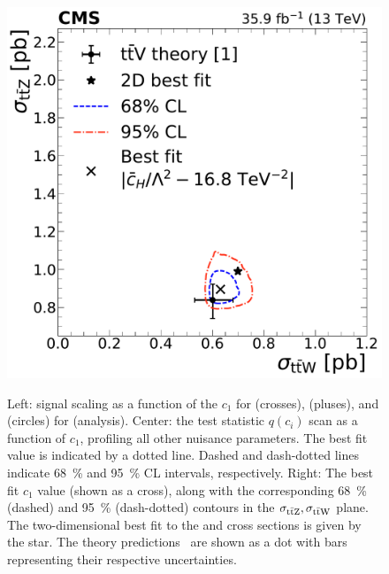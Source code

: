\begin{landscape}
\begin{figure}
{        \includegraphics[height=\textheight]{figures/thirteen-TeV/NP/2D/ttZ_ttW_2D_1D_cH}
      }
    \setlength{\capwidth}{14cm}
    \caption[Profile likelihood, $\mu(c_1)$, and best fit $c_1$ for \cH (\thirteenTeV)]{Left: signal scaling as a function of the $c_1$ for \ttW (crosses), \ttZ (pluses), and \ttH (circles) for \cH (\thirteenTeV analysis). Center: the test statistic $q(c_i)$ scan as a function of $c_1$, profiling all other nuisance parameters. The best fit value is indicated by a dotted line. Dashed and dash-dotted lines indicate \SI{68}{\percent} and \SI{95}{\percent} CL intervals, respectively. Right: The best fit $c_1$ value (shown as a cross), along with the corresponding \SI{68}{\percent} (dashed) and \SI{95}{\percent} (dash-dotted) contours in the $\sigma_{\text{t}\bar{\text{t}}\text{Z}}, \sigma_{\text{t}\bar{\text{t}}\text{W}}$ plane. The two-dimensional best fit to the \ttW and \ttZ cross sections is given by the star. The theory predictions~\cite{deFlorian:2016spz} are shown as a dot with bars representing their respective uncertainties.}
    \label{fig:results-cH}
  \end{figure}
  \begin{figure}
      \centering
      \resizebox{!}{7.2cm}{
}
\end{figure}
\end{landscape}
